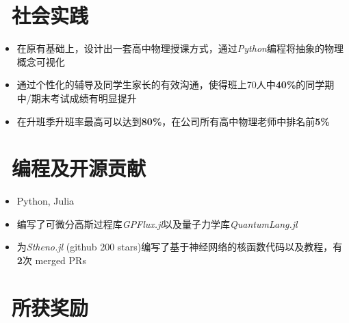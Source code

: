 \documentclass{resume}
\begin{document}
\section{\faUsers\ 社会实践}
\begin{itemize}
  \item 在原有基础上，设计出一套高中物理授课方式，通过\textit{Python}编程将抽象的物理概念可视化
  \item 通过个性化的辅导及同学生家长的有效沟通，使得班上70人中\textbf{40\%}的同学期中/期末考试成绩有明显提升
  \item 在升班季升班率最高可以达到\textbf{80\%}，在公司所有高中物理老师中排名前\textbf{5\%}
\end{itemize}

\section{\faCogs\ 编程及开源贡献}
\begin{itemize}[parsep=0.5ex]
  \item Python, Julia
  \item 编写了可微分高斯过程库\textit{GPFlux.jl}以及量子力学库\textit{QuantumLang.jl}
  \item 为\textit{Stheno.jl} (github 200 stars)编写了基于神经网络的核函数代码以及教程，有\textbf{2}次 merged PRs
\end{itemize}

\section{\faHeartO\ 所获奖励}
\end{document}
